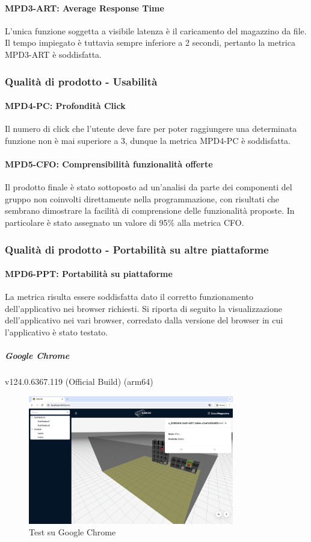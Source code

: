 \paragraph{MPD3-ART: Average Response Time}
L'unica funzione soggetta a visibile latenza è il caricamento del magazzino da file. Il tempo impiegato è tuttavia sempre inferiore a 2 secondi, pertanto la metrica MPD3-ART è soddisfatta.

\subsubsection{Qualità di prodotto - Usabilità}

\paragraph{MPD4-PC: Profondità Click}
Il numero di click che l'utente deve fare per poter raggiungere una determinata funzione non è mai superiore a 3, dunque la metrica MPD4-PC è soddisfatta.

\paragraph{MPD5-CFO: Comprensibilità funzionalità offerte}
Il prodotto finale è stato sottoposto ad un'analisi da parte dei componenti del gruppo non coinvolti direttamente nella programmazione, con risultati che sembrano dimostrare la facilità di comprensione delle funzionalità proposte. In particolare è stato assegnato un valore di 95\% alla metrica CFO.


\newpage
\subsubsection{Qualità di prodotto - Portabilità su altre piattaforme}
\paragraph{MPD6-PPT: Portabilità su piattaforme}
La metrica risulta essere soddisfatta dato il corretto funzionamento dell'applicativo nei browser richiesti. Si riporta di seguito la visualizzazione dell'applicativo nei vari browser, corredato dalla versione del browser in cui l'applicativo è stato testato.

\subparagraph{Google Chrome}
v124.0.6367.119 (Official Build) (arm64)
\begin{figure}[H] 
    \centering
    \includegraphics[width=0.8\textwidth]{images/chrome.png}
    \caption{Test su Google Chrome}
\end{figure}



